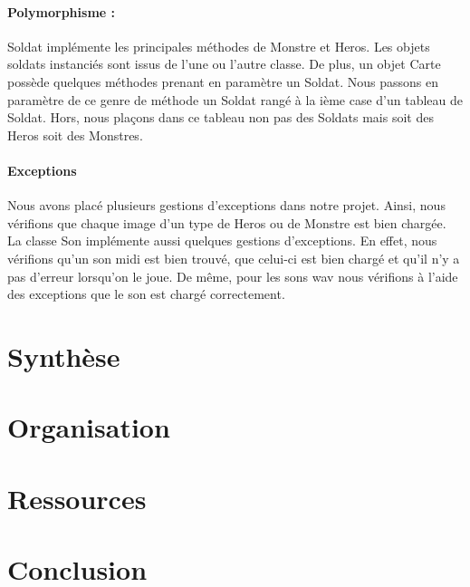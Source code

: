\documentclass{report}
\begin{document}
\paragraph{Polymorphisme :}
Soldat implémente les principales méthodes de Monstre et Heros. 
Les objets soldats instanciés sont issus de l'une ou l'autre classe.
De plus, un objet Carte possède quelques méthodes prenant en paramètre un Soldat. 
Nous passons en paramètre de ce genre de méthode un Soldat rangé à la ième case d'un tableau de Soldat. 
Hors, nous plaçons dans ce tableau non pas des Soldats mais soit des Heros soit des Monstres.

\paragraph{Exceptions}
Nous avons placé plusieurs gestions d'exceptions dans notre projet.
Ainsi, nous vérifions que chaque image d'un type de Heros ou de Monstre est bien chargée. 
La classe Son implémente aussi quelques gestions d'exceptions. 
En effet, nous vérifions qu'un son midi est bien trouvé, que celui-ci est bien chargé et qu'il n'y a pas d'erreur lorsqu'on le joue.
De même, pour les sons wav nous vérifions à l'aide des exceptions que le son est chargé correctement.


\section{Synthèse}
\section{Organisation}
\section{Ressources}
\section{Conclusion}
\end{document}
